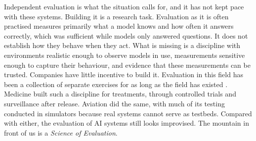 Independent evaluation is what the situation calls for, and it has not kept pace
with these systems. Building it is a research task. Evaluation as it is often
practised measures primarily what a model knows and how often it answers correctly,
which was sufficient while models only answered questions. It does not establish
how they behave when they act. What is missing is a discipline with environments
realistic enough to observe models in use, measurements sensitive enough to capture
their behaviour, and evidence that these measurements can be trusted. Companies
have little incentive to build it. Evaluation in this field has been a collection
of separate exercises for as long as the field has existed
\citep{truongkoyejo2026aims}. Medicine built such a discipline for treatments,
through controlled trials and surveillance after release. Aviation did the same,
with much of its testing conducted in simulators because real systems cannot serve
as testbeds. Compared with either, the evaluation of AI systems still looks
improvised. The mountain in front of us is a \textit{Science of Evaluation}.
